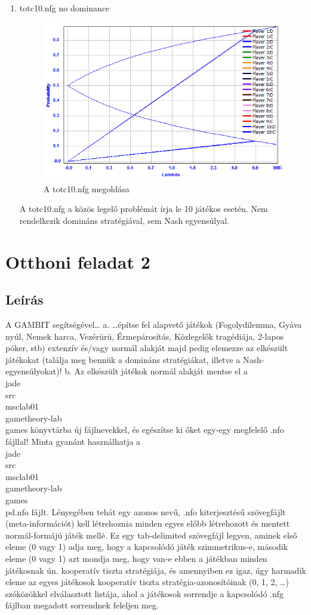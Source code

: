 \begin{enumerate}
\item totc10.nfg
		no dominance
		\begin{figure}[h]
		\begin{center}
		\includegraphics[height=7cm]{figures/tot.png}
		\caption{A totc10.nfg megoldása}
		\end{center}
		\end{figure}
A totc10.nfg a közös legelő problémát írja le 10 játékos esetén. Nem rendelkezik domináns stratégiával, sem Nash egyensúlyal.
		
\end{enumerate}
\section{Otthoni feladat 2}
\subsection{Leírás}
A GAMBIT segítségével… a. …építse fel alapvető játékok (Fogolydilemma, Gyáva nyúl, Nemek harca, Vezérürü, Érmepárosítás, Közlegelők tragédiája, 2-lapos póker, stb) extenzív és/vagy normál alakját majd pedig elemezze az elkészült játékokat (találja meg bennük a domináns stratégiákat, illetve a Nash-egyensúlyokat)! b. Az elkészült játékok normál alakját mentse el a \\jade\\src\\msclab01
\\gametheory-lab\\games könyvtárba új fájlnevekkel, és egészítse ki őket egy-egy megfelelő .nfo fájllal! Minta gyanánt használhatja a \\jade\\src\\msclab01\\gametheory-lab\\games\\pd.nfo fájlt. Lényegében tehát egy azonos nevű, .nfo kiterjesztésű szövegfájlt (meta-információt) kell létrehoznia minden egyes előbb létrehozott és mentett normál-formájú játék mellé. Ez egy tab-delimited szövegfájl legyen, aminek első eleme (0 vagy 1) adja meg, hogy a kapcsolódó játék szimmetrikus-e, második eleme (0 vagy 1) azt mondja meg, hogy van-e ebben a játékban minden játékosnak ún. kooperatív tiszta stratégiája, és amennyiben ez igaz, úgy harmadik eleme az egyes játékosok kooperatív tiszta stratégia-azonosítóinak (0, 1, 2, …) szóközökkel elválasztott listája, ahol a játékosok sorrendje a kapcsolódó .nfg fájlban megadott sorrendnek feleljen meg.

